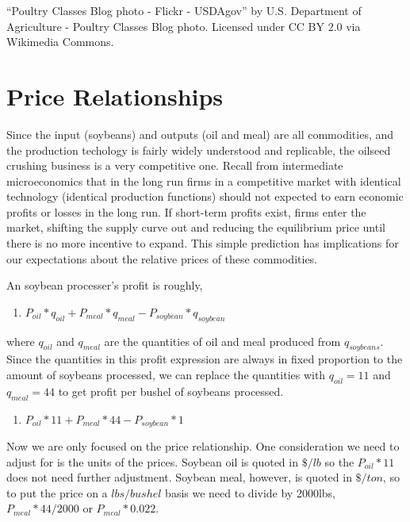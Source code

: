 \documentclass[
]{book}
\providecommand{\tightlist}{%
  \setlength{\itemsep}{0pt}\setlength{\parskip}{0pt}}
\begin{document}
``Poultry Classes Blog photo - Flickr - USDAgov'' by U.S. Department of Agriculture - Poultry Classes Blog photo. Licensed under CC BY 2.0 via Wikimedia Commons.

\hypertarget{price-relationships}{%
\section{Price Relationships}\label{price-relationships}}

Since the input (soybeans) and outputs (oil and meal) are all commodities, and the production techology is fairly widely understood and replicable, the oilseed crushing business is a very competitive one. Recall from intermediate microeconomics that in the long run firms in a competitive market with identical technology (identical production functions) should not expected to earn economic profits or losses in the long run. If short-term profits exist, firms enter the market, shifting the supply curve out and reducing the equilibrium price until there is no more incentive to expand. This simple prediction has implications for our expectations about the relative prices of these commodities.

An soybean processer's profit is roughly,

\begin{enumerate}
\def\labelenumi{\arabic{enumi}.}
\tightlist
\item
  \(P_{oil}*q_{oil} + P_{meal}*q_{meal} - P_{soybean}*q_{soybean}\)
\end{enumerate}

where \(q_{oil}\) and \(q_{meal}\) are the quantities of oil and meal produced from \(q_{soybeans}\). Since the quantities in this profit expression are always in fixed proportion to the amount of soybeans processed, we can replace the quantities with \(q_{oil} = 11\) and \(q_{meal} = 44\) to get profit per bushel of soybeans processed.

\begin{enumerate}
\def\labelenumi{\arabic{enumi}.}
\setcounter{enumi}{1}
\tightlist
\item
  \(P_{oil}*11 + P_{meal}*44 - P_{soybean}*1\)
\end{enumerate}

Now we are only focused on the price relationship. One consideration we need to adjust for is the units of the prices. Soybean oil is quoted in \(\$/lb\) so the \(P_{oil}*11\) does not need further adjustment. Soybean meal, however, is quoted in \(\$/ton\), so to put the price on a \(lbs/bushel\) basis we need to divide by 2000lbs, \(P_{meal}*44/2000\) or \(P_{meal}*0.022\).
\end{document}
